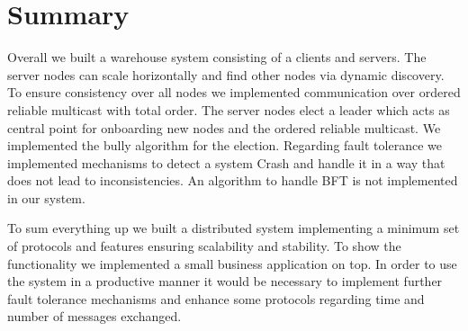 \chapter{Summary}\label{ch:Summary}
Overall we built a warehouse system consisting of a clients and servers. The server nodes can scale horizontally and find other nodes via dynamic discovery. To ensure consistency over all nodes we implemented communication over ordered reliable multicast with total order. The server nodes elect a leader which acts as central point for onboarding new nodes and the ordered reliable multicast. We implemented the bully algorithm for the election. Regarding fault tolerance we implemented mechanisms to detect a system Crash and handle it in a way that does not lead to inconsistencies. An algorithm to handle \ac{BFT} is not implemented in our system.

To sum everything up we built a distributed system implementing a minimum set of protocols and features ensuring scalability and stability. To show the functionality we implemented a small business application on top. In order to use the system in a productive manner it would be necessary to implement further fault tolerance mechanisms and enhance some protocols regarding time and number of messages exchanged.